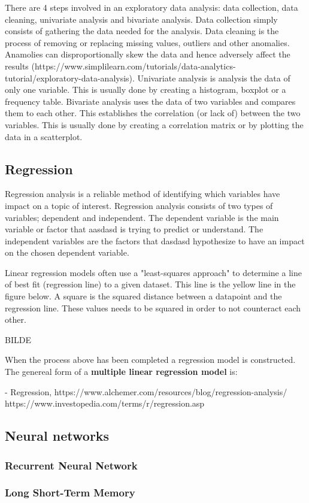 There are 4 steps involved in an exploratory data analysis: data collection, data cleaning, univariate analysis and bivariate analysis. 
Data collection simply consists of gathering the data needed for the analysis. 
Data cleaning is the process of removing or replacing missing values, outliers and other anomalies. Anamolies can disproportionally skew the data and hence adversely affect the results (https://www.simplilearn.com/tutorials/data-analytics-tutorial/exploratory-data-analysis).
Univariate analysis is analysis the data of only one variable. This is usually done by creating a histogram, boxplot or a frequency table.  
Bivariate analysis uses the data of two variables and compares them to each other. This establishes the correlation (or lack of) between the two variables. This is usually done by creating a correlation matrix or by plotting the data in a scatterplot. 

\subsection{Regression}
Regression analysis is a reliable method of identifying which variables have impact on a topic of interest. Regression analysis consists of two types of variables; dependent and independent. The dependent variable is the main variable or factor that aasdasd is trying to predict or understand. The independent variables are the factors that dasdasd hypothesize to have an impact on the chosen dependent variable. 

Linear regression models often use a "least-squares approach" to determine a line of best fit (regression line) to a given dataset. This line is the yellow line in the figure below. A square is the squared distance between a datapoint and the regression line. These values needs to be squared in order to not counteract each other.   

BILDE

When the process above has been completed a regression model is constructed. The genereal form of a \textbf{multiple linear regression model} is:  

- Regression, https://www.alchemer.com/resources/blog/regression-analysis/\\ 

https://www.investopedia.com/terms/r/regression.asp

\subsection{Neural networks}
\subsubsection{Recurrent Neural Network}
\subsubsection{Long Short-Term Memory}
